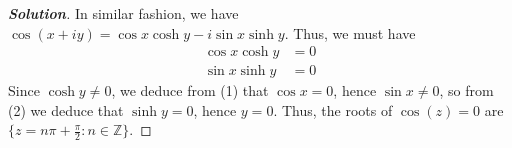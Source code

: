 \documentclass[12pt,leqno]{article}
\theoremstyle{definition}
\newcommand{\Z}{\mathbb{Z}}
\newenvironment{Solution}{\begin{proof}[\textnormal{\textbf{Solution}}]}{\end{proof}}
\begin{document}
\begin{enumerate}
\begin{Solution}
In similar fashion, we have $\cos(x+iy)=\cos x\cosh y-i\sin x\sinh y$. Thus, we must have \begin{align*}\tag{1}\cos x\cosh y&=0\\\tag{2}\sin x\sinh y&=0\end{align*} Since $\cosh y\not=0$, we deduce from (1) that $\cos x=0$, hence $\sin x\not=0$, so from (2) we deduce that $\sinh y=0$, hence $y=0$. Thus, the roots of $\cos(z)=0$ are $\{z=n\pi+\frac{\pi}{2}:n\in\Z\}$.
  \end{Solution}
\end{enumerate}
\end{document}
